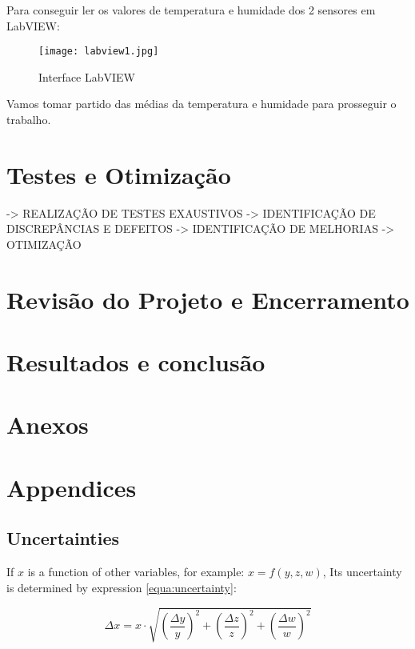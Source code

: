 \documentclass[journal]{IEEEtran}
\begin{document}
Para conseguir ler os valores de temperatura e humidade dos 2 sensores em LabVIEW:

 \begin{figure}[H]
    \centering
    \texttt{[image: labview1.jpg]}
    \caption{\label{fig:1} Interface LabVIEW}
    \label{fig:3}
\end{figure}

Vamos tomar partido das médias da temperatura e humidade para prosseguir o trabalho.








\section{Testes e Otimização}

-> REALIZAÇÃO DE TESTES EXAUSTIVOS
-> IDENTIFICAÇÃO DE DISCREPÂNCIAS E DEFEITOS
-> IDENTIFICAÇÃO DE MELHORIAS
-> OTIMIZAÇÃO






\section{Revisão do Projeto e Encerramento}






 
\section{Resultados e conclusão}







\section{Anexos}









\newpage
\section{Appendices}






\subsection{Uncertainties}

If $x$ is a function of other variables, for example: $x = f(y,z,w)$, Its uncertainty is determined by expression \ref{equa:uncertainty}:

\begin{equation}
    \Delta x = x \cdot \sqrt{(\frac{\Delta y}{y})^2+(\frac{\Delta z}{z})^2+(\frac{\Delta w}{w})^2}
    \label{equa:uncertainty}
\end{equation}



\end{document}
